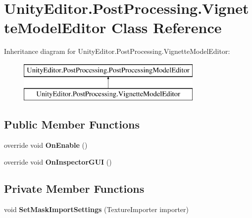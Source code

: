 \hypertarget{class_unity_editor_1_1_post_processing_1_1_vignette_model_editor}{}\section{Unity\+Editor.\+Post\+Processing.\+Vignette\+Model\+Editor Class Reference}
\label{class_unity_editor_1_1_post_processing_1_1_vignette_model_editor}
Inheritance diagram for Unity\+Editor.\+Post\+Processing.\+Vignette\+Model\+Editor\+:\begin{figure}[H]
\begin{center}
\leavevmode
\includegraphics[height=2.000000cm]{class_unity_editor_1_1_post_processing_1_1_vignette_model_editor}
\end{center}
\end{figure}
\subsection*{Public Member Functions}
\begin{DoxyCompactItemize}
\item 
\mbox{\label{class_unity_editor_1_1_post_processing_1_1_vignette_model_editor_aa8b2441f6cd3fcd3f34c88d03a24be18}} 
override void {\bfseries On\+Enable} ()
\item 
\mbox{\label{class_unity_editor_1_1_post_processing_1_1_vignette_model_editor_ad058e20158c114d74518f6b0268789d6}} 
override void {\bfseries On\+Inspector\+G\+UI} ()
\end{DoxyCompactItemize}
\subsection*{Private Member Functions}
\begin{DoxyCompactItemize}
\item 
\mbox{\label{class_unity_editor_1_1_post_processing_1_1_vignette_model_editor_afaea4fa46bbce796a81b4ff91f0491f2}} 
void {\bfseries Set\+Mask\+Import\+Settings} (Texture\+Importer importer)
\end{DoxyCompactItemize}
